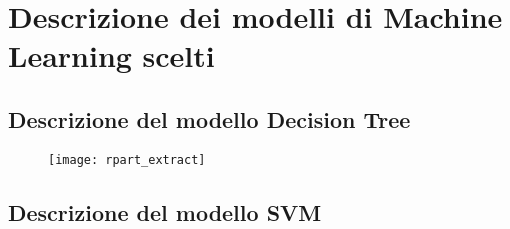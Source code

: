 \section{Descrizione dei modelli di Machine Learning scelti} 
\subsection{Descrizione del modello Decision Tree}



\begin{figure}[H]
	\centering
	\texttt{[image: rpart\_extract]}
\end{figure}

\subsection{Descrizione del modello SVM}







